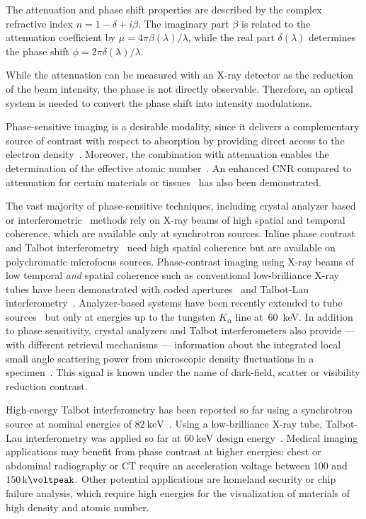 \documentclass[english]{nature}
\begin{document}
The attenuation and phase shift properties are described by the complex
refractive index $n=1 - \delta + i \beta$. The imaginary part $\beta$ is
related to the attenuation coefficient by $\mu = 4 \pi \beta(\lambda) /
\lambda$, while the real part $\delta(\lambda)$ determines the phase shift
$\phi = 2 \pi \delta(\lambda) / \lambda$.

While the attenuation can be measured with an X-ray detector as the
reduction of the beam intensity, the phase is not directly observable.
Therefore, an optical system is needed to convert the phase shift into
intensity modulations.

Phase-sensitive imaging is a desirable modality, since it delivers a
complementary source of contrast with respect to absorption by providing
direct access to the electron density~\cite{Als-Nielsen2011}. Moreover, the
combination with attenuation enables the determination of the effective
atomic number~\cite{Qi2010}. An enhanced \ac{CNR} compared to
attenuation for certain materials or
tissues~\cite{Pfeiffer2007a,McDonald2009} has also been demonstrated.

The vast majority of phase-sensitive techniques, including crystal analyzer
based~\cite{Davis1995,Chapman1997} or
interferometric~\cite{Bonse1965,Momose1996} methods rely on X-ray beams of
high spatial and temporal coherence, which are available only at synchrotron
sources. Inline phase contrast~\cite{Snigirev1995,Wilkins1996,Cloetens1996}
and Talbot interferometry~\cite{Cloetens1997,David2002,Momose2003a} need
high spatial coherence but are available on polychromatic microfocus
sources. Phase-contrast imaging using X-ray beams of low temporal \emph{and}
spatial coherence such as conventional low-brilliance X-ray tubes have been
demonstrated with coded apertures~\cite{Munro2012} and Talbot-Lau
interferometry~\cite{Pfeiffer2006}. Analyzer-based systems have been
recently extended to tube sources~\cite{Nesch2009,Parham2009} but only at
energies up to the tungsten $K_\alpha$ line at~\SI{60}{\kilo\eV}. In
addition to phase sensitivity, crystal analyzers and Talbot interferometers
also provide --- with different retrieval mechanisms --- information
about the integrated local small angle scattering power from microscopic
density fluctuations in a specimen~\cite{Pfeiffer2008}. This signal is known
under the name of dark-field, scatter or visibility reduction contrast.

High-energy Talbot interferometry has been reported so far using a
synchrotron source at nominal energies of
$\SI{82}{\kilo\electronvolt}$~\cite{Willner2013}. Using a low-brilliance
X-ray tube, Talbot-Lau interferometry was applied so far at
$\SI{60}{\kilo\electronvolt}$ design energy~\cite{Donath2009a}. Medical imaging
applications may benefit from phase contrast at higher energies: chest or
abdominal radiography or \ac{CT} require an acceleration voltage between
\num{100} and $\SI{150}{\kilo\voltpeak}$. Other potential applications are
homeland security or chip failure analysis, which require high energies for
the visualization of materials of high density and atomic number.
\end{document}

